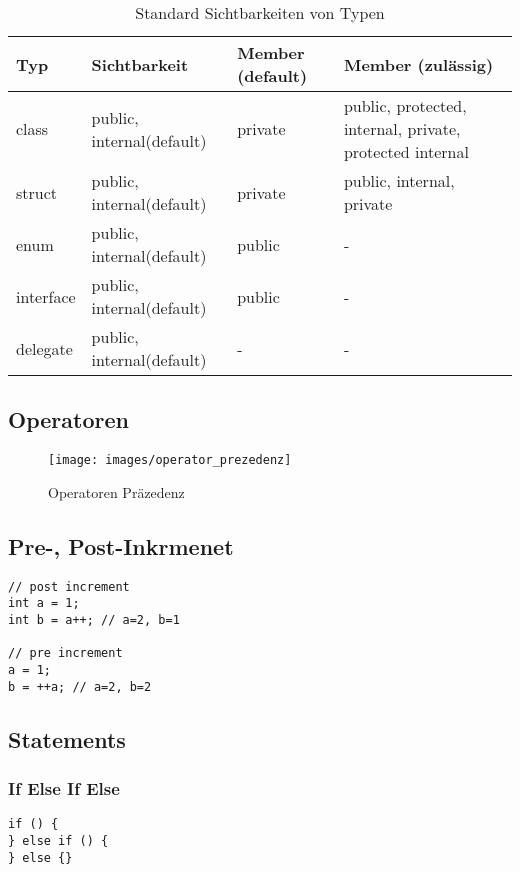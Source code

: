 \begin{table}[h]
	\centering
	\begin{tabu} to \linewidth {l l l X}
		\toprule 
		Typ & Sichtbarkeit & Member (default) & Member (zulässig)\\
		\midrule
		class & public, internal(default) & private & public, protected, internal, private, protected internal \\
		struct & public, internal(default) & private & public, internal, private \\	
		enum & public, internal(default) & public & - \\
		interface & public, internal(default) & public & - \\
		delegate & public, internal(default) & - & - \\
		\bottomrule
	\end{tabu} 
	\caption{Standard Sichtbarkeiten von Typen}
\end{table}

\newpage

\subsection{Operatoren}
\begin{figure}[h!]
\centering
\texttt{[image: images/operator\_prezedenz]}
\caption{Operatoren Präzedenz}
\label{fig:operatorprezedenz}
\end{figure}

\clearpage

\subsection{Pre-, Post-Inkrmenet}
\begin{lstlisting}
// post increment
int a = 1;
int b = a++; // a=2, b=1

// pre increment
a = 1;
b = ++a; // a=2, b=2
\end{lstlisting}

\subsection{Statements}
\subsubsection{If Else If Else}
\begin{lstlisting}
if () {
} else if () {
} else {}
\end{lstlisting}

